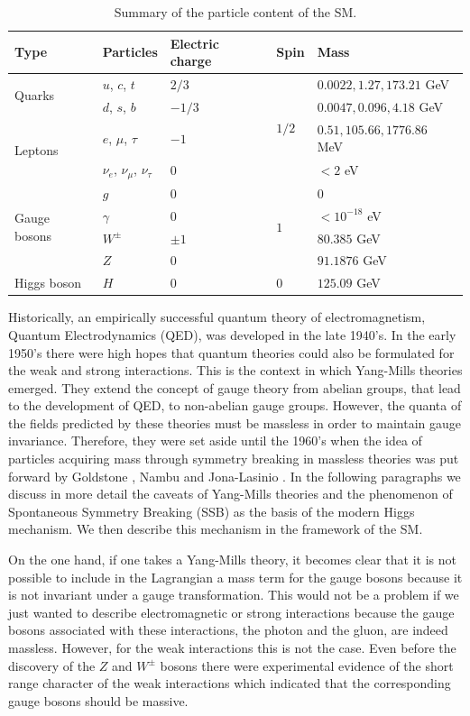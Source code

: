 \begin{table}
	\centering
	\begin{tabular}{lllll}
		\toprule 
		Type& Particles & Electric charge & Spin & Mass \\
		\midrule
		\multirow{2}{*}{Quarks} & $u$, $c$, $t$ & $2/3$ & \multirow{4}{*}{$1/2$}  & $0.0022,1.27,173.21$ GeV\\
		  & $d$, $s$, $b$ & $-1/3$ &  & $0.0047,0.096,4.18$ GeV\\
		\multirow{2}{*}{Leptons} & $e$, $\mu$, $\tau$ & $-1$ &  &  $0.51,105.66,1776.86$ MeV\\
		& $\nu_e$, $\nu_{\mu}$, $\nu_{\tau}$ & $0$ &  & $<2$ eV \\
		\midrule \midrule
		\multirow{4}{*}{Gauge bosons} & $g$ &$0$ &\multirow{4}{*}{$1$} & $0$\\
		 & $\gamma$ & $0$ &  &  $< 10^{-18}$ eV\\
		 & $W^{\pm}$ & $\pm 1$& & $80.385$ GeV \\
		& $Z$ & $0$& & $91.1876$ GeV\\
		\midrule \midrule
		Higgs boson & $H$ & $0$ & $0$ & $125.09$ GeV\\
		\bottomrule
	\end{tabular}
	\caption{Summary of the particle content of the SM.}
	\label{table:SM}
\end{table}

Historically, an empirically successful quantum theory of electromagnetism, Quantum Electrodynamics (QED), was developed in the late 1940's. In the early 1950's there were high hopes that quantum theories could also be formulated for the weak and strong interactions. This is the context in which Yang-Mills theories emerged. They extend the concept of gauge theory from abelian groups, that lead to the development of QED, to non-abelian gauge groups. However, the quanta of the fields predicted by these theories must be massless in order to maintain gauge invariance. Therefore, they were set aside until the 1960's when the idea of particles acquiring mass through symmetry breaking in massless theories was put forward by Goldstone \cite{Goldstone}, Nambu and Jona-Lasinio \cite{Nambu-Jona-Lasinio}. In the following paragraphs we discuss in more detail the caveats of Yang-Mills theories and the phenomenon of Spontaneous Symmetry Breaking (SSB) as the basis of the modern Higgs mechanism. We then describe this mechanism in the framework of the SM.   

On the one hand, if one takes a Yang-Mills theory, it becomes clear that it is not possible to include in the Lagrangian a mass term for the gauge bosons because it is not invariant under a gauge transformation. This would not be a problem if we just wanted to describe electromagnetic or strong interactions because the gauge bosons associated with these interactions, the photon and the gluon, are indeed massless. However, for the weak interactions this is not the case. Even before the discovery of the $Z$ and $W^{\pm}$ bosons \cite{Zdiscovery,Wdiscovery} there were experimental evidence of the short range character of the weak interactions which indicated that the corresponding gauge bosons should be massive. 

